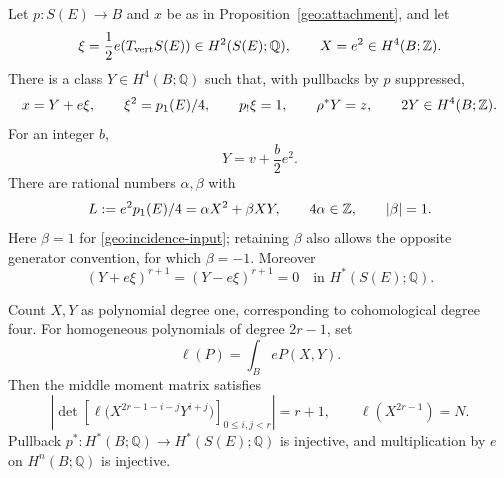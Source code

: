 \begin{proposition}\label{geo:parameters}
Let $p:S(E)\to B$ and $x$ be as in
Proposition~\ref{geo:attachment}, and let
\[
 \xi=\frac12e(T_{\mathrm{vert}}S(E))\in H^2(S(E);\mathbb Q),
 \qquad X=e^2\in H^4(B;\mathbb Z).
\]
There is a class $Y\in H^4(B;\mathbb Q)$ such that, with
pullbacks by $p$ suppressed,
\begin{equation}\label{geo:sphere-parameters}
 x=Y+e\xi,\qquad
 \xi^2=p_1(E)/4,\qquad p_!\xi=1,\qquad
 \rho^*Y=z,\qquad 2Y\in H^4(B;\mathbb Z).
\end{equation}
For an integer $b$,
\begin{equation}\label{geo:Y-lift}
 Y=v+\frac b2e^2.
\end{equation}
There are rational numbers $\alpha,\beta$ with
\begin{equation}\label{geo:L-parameters}
 L:=e^2p_1(E)/4=\alpha X^2+\beta XY,\qquad
 4\alpha\in\mathbb Z,\qquad |\beta|=1.
\end{equation}
Here $\beta=1$ for \eqref{geo:incidence-input}; retaining $\beta$
also allows the opposite generator convention, for which
$\beta=-1$.
Moreover
\begin{equation}\label{geo:two-nilpotents}
 (Y+e\xi)^{r+1}=(Y-e\xi)^{r+1}=0
 \quad\text{in }H^*(S(E);\mathbb Q).
\end{equation}

Count $X,Y$ as polynomial degree one, corresponding to
cohomological degree four.  For homogeneous polynomials of
degree $2r-1$, set
\[
 \ell(P)=\int_B eP(X,Y).
\]
Then the middle moment matrix satisfies
\begin{equation}\label{geo:moment-determinant}
 \left|\det\left[
 \ell\big(X^{2r-1-i-j}Y^{i+j}\big)
 \right]_{0\le i,j<r}\right|=r+1,
 \qquad \ell(X^{2r-1})=N.
\end{equation}
Pullback $p^*:H^*(B;\mathbb Q)\to H^*(S(E);\mathbb Q)$
is injective, and multiplication by $e$ on $H^n(B;\mathbb Q)$
is injective.
\end{proposition}

